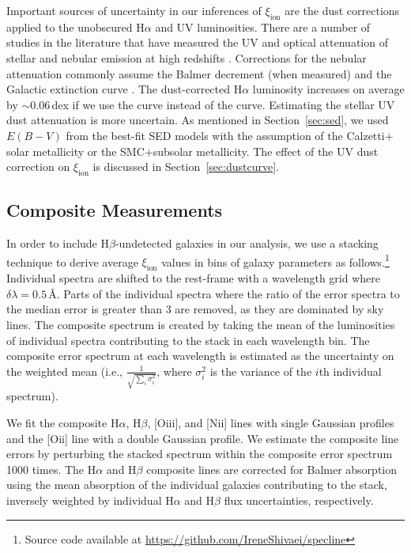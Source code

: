 \documentclass[iop]{emulateapj}
\newcommand{\xiion}{\ensuremath{\xi_{\mathrm{ion}}}}
\newcommand{\halpha}{H\ensuremath{\alpha}}
\newcommand{\hbeta}{H\ensuremath{\beta}}
\begin{document}
Important sources of uncertainty in our inferences of {\xiion} are the dust corrections applied to the unobscured {\halpha} and UV luminosities. There are a number of studies in the literature that have measured the UV and optical attenuation of stellar and nebular emission at high redshifts \citep[][among many others]{noll09,wild11,reddy12b,reddy15,shivaei15a,debarros16,shivaei16}.  Corrections for the nebular attenuation commonly assume the Balmer decrement (when measured) and the \citet{cardelli89} Galactic extinction curve \citep{calzetti00,steidel14,reddy15,shivaei16}. The dust-corrected {\halpha} luminosity increases on average by $\sim 0.06$\,dex if we use the \citet{calzetti00} curve instead of the \citet{cardelli89} curve. Estimating the stellar UV dust attenuation is more uncertain. As mentioned in Section~\ref{sec:sed}, we used $E(B-V)$ from the best-fit SED models with the assumption of the Calzetti$+$solar metallicity or the SMC$+$subsolar metallicity. The effect of the UV dust correction on {\xiion} is discussed in Section~\ref{sec:dustcurve}.

\subsection{Composite Measurements}
\label{sec:stack}

In order to include {\hbeta}-undetected galaxies in our analysis, we use a stacking technique to derive average {\xiion} values in bins of galaxy parameters as follows.\footnote{Source code available at \url{https://github.com/IreneShivaei/specline}}
Individual spectra are shifted to the rest-frame with a wavelength grid where $\delta\lambda = 0.5$\,\AA. 
Parts of the individual spectra where the ratio of the error spectra to the median error is greater than 3 are removed, as they are dominated by sky lines. 
The composite spectrum is created by taking the mean of the luminosities of individual spectra contributing to the stack in each wavelength bin.
The composite error spectrum at each wavelength is estimated as the uncertainty on the weighted mean (i.e., $\frac{1}{\sqrt{\sum\limits_{i} \sigma_i^2}}$, where $\sigma_i^2$ is the variance of the $i$th individual spectrum).

We fit the composite {\halpha}, {\hbeta}, [O{\sc iii}], and [N{\sc ii}] lines with single Gaussian profiles and the [O{\sc ii}] line with a double Gaussian profile. We estimate the composite line errors by perturbing the stacked spectrum within the composite error spectrum 1000 times. The {\halpha} and {\hbeta} composite lines are corrected for Balmer absorption using the mean absorption of the individual galaxies contributing to the stack, inversely weighted by individual {\halpha} and {\hbeta} flux uncertainties, respectively.
\end{document}
